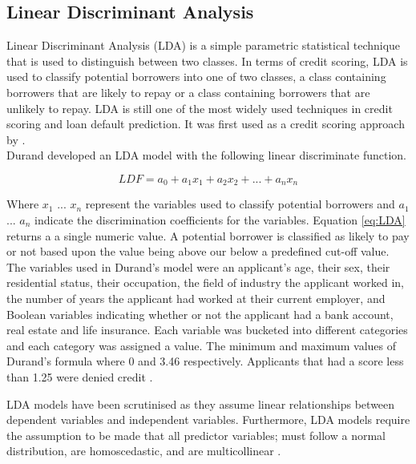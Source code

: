 \subsection{Linear Discriminant Analysis}

Linear Discriminant Analysis (LDA) is a simple parametric statistical technique that is used to distinguish between two classes. In terms of credit scoring, LDA is used to classify potential borrowers into one of two classes, a class containing borrowers that are likely to repay or a class containing borrowers that are unlikely to repay. LDA is still one of the most widely used techniques in credit scoring and loan default prediction. It was first used as a credit scoring approach by \textcite{DurandLDA}. \\

Durand developed an LDA model with the following linear discriminate function.

\vspace{10pt}

\begin{equation} \label{eq:LDA}
LDF = a_{0} + a_{1}x_{1} + a_{2}x_{2}+ ... +  a_{n}x_{n}
\end{equation}

\vspace{10pt}

Where $x_{1}$ ... $x_{n}$ represent the variables used to classify potential borrowers and $a_{1}$ ... $a_{n}$ indicate the discrimination coefficients for the variables. Equation \ref{eq:LDA} returns a a single numeric value. A potential borrower is classified as likely to pay or not based upon the value being above our below a predefined cut-off value. \\

The variables used in Durand's model were an applicant's age, their sex, their residential status, their occupation, the field of industry the applicant worked in, the number of years the applicant had worked at their current employer, and Boolean variables indicating whether or not the applicant had a bank account, real estate and life insurance. Each variable was bucketed into different categories and each category was assigned a value. The minimum and maximum values of Durand's formula where 0 and 3.46 respectively. Applicants that had a score less than 1.25 were denied credit \parencite{DurandLDA}.  \newpage

LDA models have been scrutinised as they assume linear relationships
between dependent variables and independent variables. Furthermore, LDA models require the assumption to be made that all predictor variables; must follow a normal distribution, are homoscedastic, and are multicollinear    \parencite{CreditScoringTechniquesOverview}.  \\

